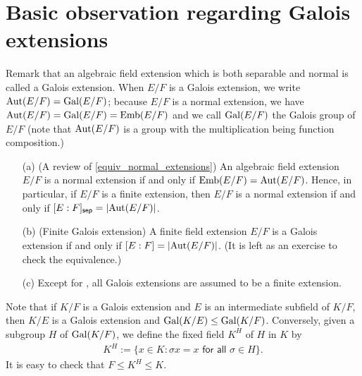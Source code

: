 \section{Basic observation regarding Galois extensions}

Remark that an algebraic field extension which is both separable and normal is called a Galois extension.
When $E/F$ is a Galois extension, we write ${\textrm{Aut}({E/F})}={\textrm{Gal}({E/F})}$; because $E/F$ is a normal extension, we have ${\textrm{Aut}({E/F})}={\textrm{Gal}({E/F})}={\textrm{Emb}({E/F})}$ and we call ${\textrm{Gal}({E/F})}$ the Galois group of $E/F$ (note that ${\textrm{Aut}({E/F})}$ is a group with the multiplication being function composition.)
\begin{rmk}
    \begin{enumerate}
        \item[(a)]
        {
            (A review of \cref{equiv_normal_extensions})
            An algebraic field extension $E/F$ is a normal extension if and only if ${\textrm{Emb}({E/F})}={\textrm{Aut}({E/F})}$.
            Hence, in particular, if $E/F$ is a finite extension, then $E/F$ is a normal extension if and only if $[E:F]_{\textsf{sep}}=|{\textrm{Aut}({E/F})}|$.
        }
        \item[(b)]
        {
            (Finite Galois extension)
            A finite field extension $E/F$ is a Galois extension if and only if $[E:F]=|{\textrm{Aut}({E/F})}|$.
            \color{brown}(It is left as an exercise to check the equivalence.)\color{black}
        }
        \item[(c)]
        {
            Except for , all Galois extensions are assumed to be a finite extension.
        }
    \end{enumerate}
\end{rmk}

Note that if $K/F$ is a Galois extension and $E$ is an intermediate subfield of $K/F$, then $K/E$ is a Galois extension and ${\textrm{Gal}({K/E})}\leq{\textrm{Gal}({K/F})}$.
Conversely, given a subgroup $H$ of ${\textrm{Gal}({K/F})}$, we define the fixed field $K^H$ of $H$ in $K$ by
\begin{align*}
    K^H:=\{x\in K: \textsf{$\sigma x=x$ for all $\sigma\in H$}\}.
\end{align*}
It is easy to check that $F\leq K^H\leq K$.

